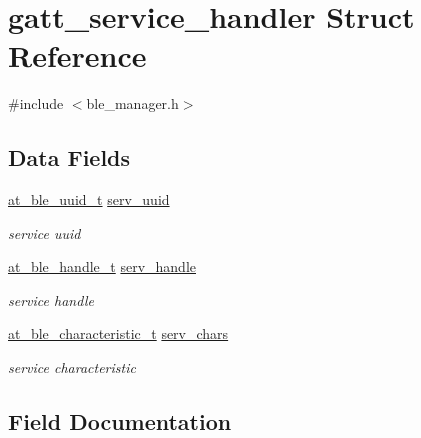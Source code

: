 \hypertarget{structgatt__service__handler}{}\section{gatt\+\_\+service\+\_\+handler Struct Reference}
\label{structgatt__service__handler}


{\ttfamily \#include $<$ble\+\_\+manager.\+h$>$}

\subsection*{Data Fields}
\begin{DoxyCompactItemize}
\item 
\mbox{\hyperlink{structat__ble__uuid__t}{at\+\_\+ble\+\_\+uuid\+\_\+t}} \mbox{\hyperlink{structgatt__service__handler_a4224f62d8329c28f97ce9e3a9e8782e8}{serv\+\_\+uuid}}
\begin{DoxyCompactList}\small\item\em service uuid \end{DoxyCompactList}\item 
\mbox{\hyperlink{at__ble__api_8h_abd23646d0c662860741f787efc8456f2}{at\+\_\+ble\+\_\+handle\+\_\+t}} \mbox{\hyperlink{structgatt__service__handler_aca01574e34f7351ca2e1fabdfa5b688a}{serv\+\_\+handle}}
\begin{DoxyCompactList}\small\item\em service handle \end{DoxyCompactList}\item 
\mbox{\hyperlink{structat__ble__characteristic__t}{at\+\_\+ble\+\_\+characteristic\+\_\+t}} \mbox{\hyperlink{structgatt__service__handler_ac76ccf31a3f82dc10b9ea2e09fce068f}{serv\+\_\+chars}}
\begin{DoxyCompactList}\small\item\em service characteristic \end{DoxyCompactList}\end{DoxyCompactItemize}


\subsection{Field Documentation}
\mbox{\label{structgatt__service__handler_ac76ccf31a3f82dc10b9ea2e09fce068f}} 
